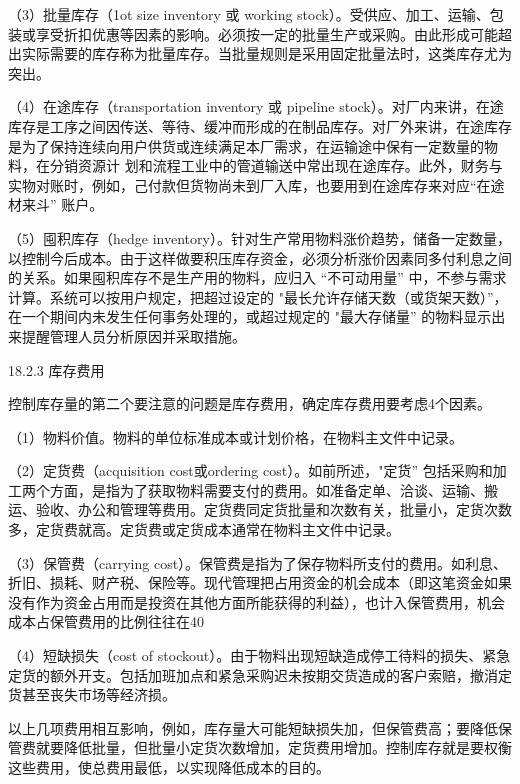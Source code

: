     （3）批量库存（1ot size inventory 或 working stock）。受供应、加工、运输、包装或享受折扣优惠等因素的影响。必须按一定的批量生产或采购。由此形成可能超出实际需要的库存称为批量库存。当批量规则是采用固定批量法时，这类库存尤为突出。

    （4）在途库存（transportation inventory 或 pipeline stock）。对厂内来讲，在途库存是工序之间因传送、等待、缓冲而形成的在制品库存。对厂外来讲，在途库存是为了保持连续向用户供货或连续满足本厂需求，在运输途中保有一定数量的物料，在分销资源计
划和流程工业中的管道输送中常出现在途库存。此外，财务与实物对账时，例如，己付款但货物尚未到厂入库，也要用到在途库存来对应“在途材来斗” 账户。

    （5）囤积库存（hedge inventory）。针对生产常用物料涨价趋势，储备一定数量，以控制今后成本。由于这样做要积压库存资金，必须分析涨价因素同多付利息之间的关系。如果囤积库存不是生产用的物料，应归入 “不可动用量” 中，不参与需求计算。系统可以按用户规定，把超过设定的 "最长允许存储天数（或货架天数）”，在一个期间内未发生任何事务处理的，或超过规定的 "最大存储量” 的物料显示出来提醒管理人员分析原因并采取措施。

18.2.3 库存费用

    控制库存量的第二个要注意的问题是库存费用，确定库存费用要考虑4个因素。

    （1）物料价值。物料的单位标准成本或计划价格，在物料主文件中记录。

    （2）定货费（acquisition cost或ordering cost）。如前所述，"定货” 包括采购和加工两个方面，是指为了获取物料需要支付的费用。如准备定单、洽谈、运输、搬运、验收、办公和管理等费用。定货费同定货批量和次数有关，批量小，定货次数多，定货费就高。定货费或定货成本通常在物料主文件中记录。

    （3）保管费（carrying cost）。保管费是指为了保存物料所支付的费用。如利息、折旧、损耗、财产税、保险等。现代管理把占用资金的机会成本（即这笔资金如果没有作为资金占用而是投资在其他方面所能获得的利益），也计入保管费用，机会成本占保管费用的比例往往在40%

    （4）短缺损失（cost of stockout）。由于物料出现短缺造成停工待料的损失、紧急定货的额外开支。包括加班加点和紧急采购迟未按期交货造成的客户索赔，撤消定货甚至丧失市场等经济损。

    以上几项费用相互影响，例如，库存量大可能短缺损失加，但保管费高；要降低保管费就要降低批量，但批量小定货次数增加，定货费用增加。控制库存就是要权衡这些费用，使总费用最低，以实现降低成本的目的。

